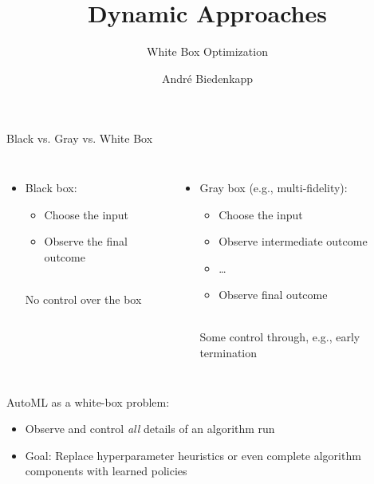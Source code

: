 \documentclass[main]{subfiles}
\title[Dynamic Approaches]{Dynamic Approaches}
\subtitle{White Box Optimization}
\author[André Biedenkapp]{André Biedenkapp}
\date{}
\begin{document}
	
	\maketitle
\begin{frame}{Black vs. Gray vs. White Box} 

    \begin{columns}
    \begin{itemize}
        \item Black box:
        \begin{itemize}
            \item Choose the input
            \item Observe the final outcome
        \end{itemize}
        \hfill\\
        No control over the box\\
        \hfill\\
        \pause
    \end{itemize}
    \begin{itemize}
        \item Gray box (e.g., multi-fidelity):
        \begin{itemize}
            \item Choose the input
            \item Observe intermediate outcome
            \item \ldots
            \item Observe final outcome
        \end{itemize}
        \hfill\\
        Some control through, e.g., early termination
    \end{itemize}
    \end{columns}
    \vspace{6ex}
    \pause
    AutoML as a white-box problem:
    \begin{itemize}
        \item Observe and control \emph{all} details of an algorithm run
        \item Goal: Replace hyperparameter heuristics or even complete algorithm components with learned policies
    \end{itemize}

\end{frame}
\end{document}
